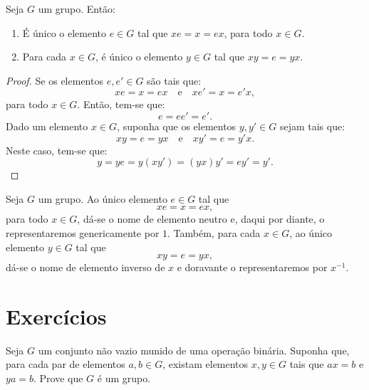\begin{proposition}
  Seja $G$ um grupo. Então:
  \begin{enumerate}
    \item É único o elemento $e\in{G}$ tal que $xe=x=ex$, para todo $x\in{G}$.
    \item Para cada $x\in{G}$, é único o elemento $y\in{G}$ tal que $xy=e=yx$.
  \end{enumerate}
\end{proposition}

\begin{proof}
  Se os elementos $e,e'\in{G}$ são tais que:
  \[
    xe=x=ex
    \quad\text{e}\quad
    xe'=x=e'x,
  \]
  para todo $x\in{G}$. Então, tem-se que:
  \[
    e=ee'=e'.
  \]
  Dado um elemento $x\in{G}$, suponha que os elementos $y,y'\in{G}$ sejam tais que:
  \[
    xy=e=yx
    \quad\text{e}\quad
    xy'=e=y'x.
  \]
  Neste caso, tem-se que:
  \[
    y=ye=y(xy')=(yx)y'=ey'=y'.
  \]
\end{proof}

\begin{remark}
  Seja $G$ um grupo. Ao único elemento $e\in{G}$ tal que \[xe=x=ex,\] para todo $x\in{G}$, dá-se o nome de elemento neutro e, daqui por diante, o representaremos genericamente por $1$. Também, para cada $x\in{G}$, ao único elemento $y\in{G}$ tal que \[xy=e=yx,\] dá-se o nome de elemento inverso de $x$ e doravante o representaremos por $x^{-1}$.
\end{remark}

\section*{Exercícios}

\begin{exercise}
  Seja $G$ um conjunto não vazio munido de uma operação binária. Suponha que, para cada par de elementos $a,b\in{G}$, existam elementos $x,y\in{G}$ tais que $ax=b$ e $ya=b$. Prove que $G$ é um grupo.
\end{exercise}
